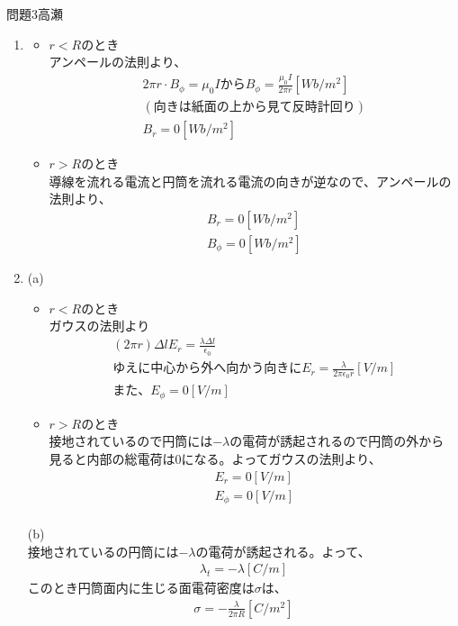 \documentclass[fleqn]{jbook}
\begin{document}
\begin{answer}{問題3}{高瀬}
\begin{enumerate}
	\item 
	\begin{itemize}
	
	\item $r<R$のとき \\
	アンペールの法則より、
		\begin{eqnarray}
		2\pi r \cdot B_\phi = \mu_0 I から B_\phi = \frac{\mu_0 I}{2 \pi r} [Wb/m^2]\\
		 (向きは紙面の上から見て反時計回り) \\
		B_r = 0 [Wb/m^2]
		\end{eqnarray}
	
	\item $r>R$のとき \\
	導線を流れる電流と円筒を流れる電流の向きが逆なので、アンペールの法則より、
		\begin{eqnarray}
		B_r = 0  [Wb/m^2]\\
		B_\phi = 0[Wb/m^2]
		\end{eqnarray}
	
	\end{itemize}
	\item 
	(a) 
		\begin{itemize}
		\item $r<R$のとき \\
		ガウスの法則より
		\begin{eqnarray}
	　　(2 \pi r) \Delta l E_r = \frac{\lambda \Delta l}{\epsilon_0}　\\
		ゆえに 中心から外へ向かう向きにE_r = \frac{\lambda}{2 \pi \epsilon_0 r} [V/m]\\
		また、	E_\phi = 0 [V/m]
		\end{eqnarray}
		\item $r>R$のとき　\\
		接地されているので円筒には$-\lambda$の電荷が誘起されるので円筒の外から
		見ると内部の総電荷は0になる。よってガウスの法則より、
		\begin{eqnarray}
			E_r = 0  [V/m]\\
			E_\phi = 0 [V/m] \\
		\end{eqnarray}
		\end{itemize}

	(b)　\\
		接地されているの円筒には$-\lambda$の電荷が誘起される。よって、
		\begin{eqnarray}
			\lambda_t = -\lambda [C/m]
		\end{eqnarray}
		このとき円筒面内に生じる面電荷密度は$\sigma$は、
		\begin{eqnarray}
			\sigma = - \frac{\lambda}{2 \pi R} [C/m^2]
		\end{eqnarray}
		

\end{enumerate}
\end{answer}
\end{document}
